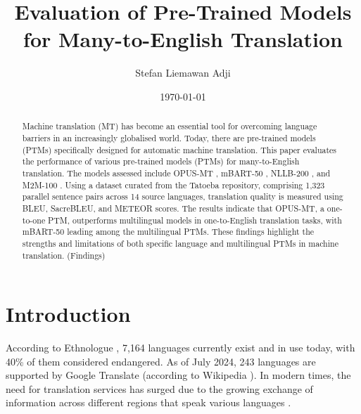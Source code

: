 \documentclass[a4paper]{article}
\title{Evaluation of Pre-Trained Models for Many-to-English Translation}
\author{Stefan Liemawan Adji}
\date{\today}
\begin{document}
\maketitle


\begin{abstract}
    Machine translation (MT) has become an essential tool for overcoming language barriers in an increasingly globalised world. Today, there are pre-trained models (PTMs) specifically designed for automatic machine translation. This paper evaluates the performance of various pre-trained models (PTMs) for many-to-English translation. The models assessed include OPUS-MT \cite{tiedemann-2020-opus-mt}, mBART-50 \cite{liu-2020-mbart}, NLLB-200 \cite{nllb200-2020}, and M2M-100 \cite{fan-2020-m2m100}. Using a dataset curated from the Tatoeba repository, comprising 1,323 parallel sentence pairs across 14 source languages, translation quality is measured using BLEU, SacreBLEU, and METEOR scores. The results indicate that OPUS-MT, a one-to-one PTM, outperforms multilingual models in one-to-English translation tasks, with mBART-50 leading among the multilingual PTMs. These findings highlight the strengths and limitations of both specific language and multilingual PTMs in machine translation. (Findings)
\end{abstract}

\section{Introduction}

According to Ethnologue \cite{ethnologue-2024}, 7,164 languages currently exist and in use today, with 40\% of them considered endangered. As of July 2024, 243 languages are supported by Google Translate (according to Wikipedia \cite{wikipedia-google-translate}). In modern times, the need for translation services has surged due to the growing exchange of information across different regions that speak various languages \cite{okpor-2014-machine-ta}.
\end{document}
